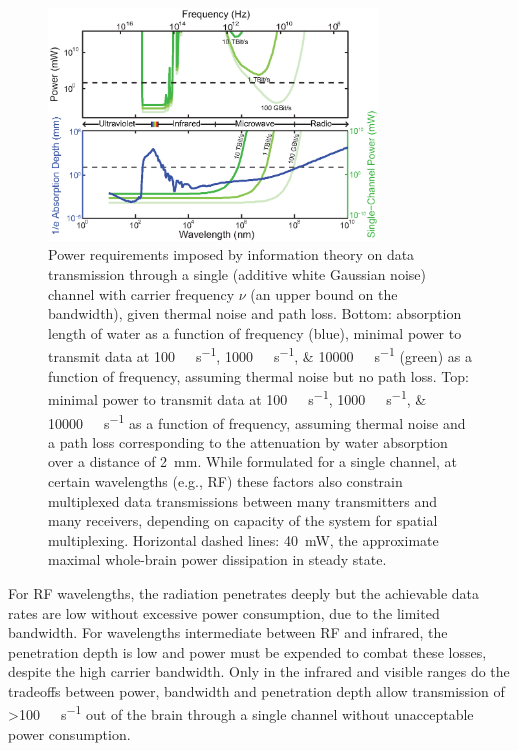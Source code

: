 \begin{figure}[htbp]
\caption{%
Power requirements imposed by information theory on data transmission through a single (additive white Gaussian noise) channel with carrier frequency $\nu$ (an upper bound on the bandwidth), given thermal noise and path loss.
Bottom: absorption length of water as a function of frequency (blue), minimal power to transmit data at \SIlist{100;1000;10000}{\giga\bit\per\second} (green) as a function of frequency, assuming thermal noise but no path loss.
Top: minimal power to transmit data at \SIlist{100;1000;10000}{\giga\bit\per\second} as a function of frequency, assuming thermal noise and a path loss corresponding to the attenuation by water absorption over a distance of \SI{2}{\milli\meter}.
While formulated for a single channel, at certain wavelengths (e.g., RF) these factors also constrain multiplexed data transmissions between many transmitters and many receivers, depending on capacity of the system for spatial multiplexing.
Horizontal dashed lines: \SI{40}{\milli\watt}, the approximate maximal whole-brain power dissipation in steady state.
}
\label{fig:rfpower}
\centering
\includegraphics[width=0.78\textwidth]{figs/Fig5.eps}
\end{figure}

For RF wavelengths, the radiation penetrates deeply but the achievable data rates are low without excessive power consumption, due to the limited bandwidth.
For wavelengths intermediate between RF and infrared, the penetration depth is low and power must be expended to combat these losses, despite the high carrier bandwidth.
Only in the infrared and visible ranges do the tradeoffs between power, bandwidth and penetration depth allow transmission of \SI{>100}{\giga\bit\per\second} out of the brain through a single channel without unacceptable power consumption.

